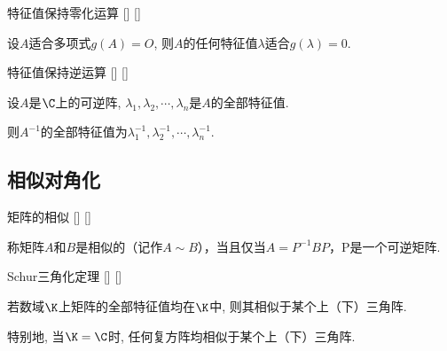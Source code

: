 \documentclass[UTF8]{ctexart}
\begin{document}
		\begin{ppt}
			[]
			{特征值保持零化运算}
			[]
			[]

			设$A$适合多项式$g(A)=O$, 则$A$的任何特征值$\lambda$适合$g(\lambda)=0$. 
		\end{ppt}
		
		\begin{ppt}
			[]
			{特征值保持逆运算}
			[]
			[]

			设$A$是$\C$上的可逆阵, $\lambda_1,\lambda_2,\cdots,\lambda_n$是$A$的全部特征值. 
			
			则$A^{-1}$的全部特征值为$\lambda_1^{-1},\lambda_2^{-1},\cdots,\lambda_n^{-1}$. 
		\end{ppt}

		
	\subsection{相似对角化}

		\begin{dfn}
			[]
			{矩阵的相似}
			[]
			[]

			称矩阵$A$和$B$是相似的（记作$A\sim B$），当且仅当$A=P^{-1}BP$，P是一个可逆矩阵.
		\end{dfn}

		\begin{thm}
			[]
			{Schur三角化定理}
			[]
			[]

			若数域$\K$上矩阵的全部特征值均在$\K$中, 则其相似于某个上（下）三角阵. 

			特别地, 当$\K=\C$时, 任何复方阵均相似于某个上（下）三角阵. 
		\end{thm}
\end{document}
